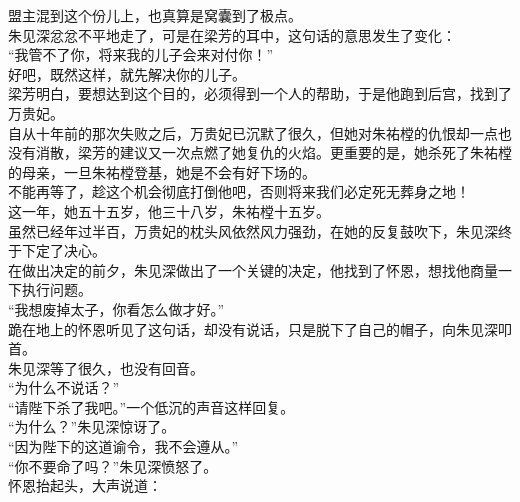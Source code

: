 \begin{multicols}{\theparacolNo}
盟主混到这个份儿上，也真算是窝囊到了极点。\\

朱见深忿忿不平地走了，可是在梁芳的耳中，这句话的意思发生了变化：\\

“我管不了你，将来我的儿子会来对付你！”\\

好吧，既然这样，就先解决你的儿子。\\

梁芳明白，要想达到这个目的，必须得到一个人的帮助，于是他跑到后宫，找到了万贵妃。\\

自从十年前的那次失败之后，万贵妃已沉默了很久，但她对朱祐樘的仇恨却一点也没有消散，梁芳的建议又一次点燃了她复仇的火焰。更重要的是，她杀死了朱祐樘的母亲，一旦朱祐樘登基，她是不会有好下场的。\\

不能再等了，趁这个机会彻底打倒他吧，否则将来我们必定死无葬身之地！\\

这一年，她五十五岁，他三十八岁，朱祐樘十五岁。\\

虽然已经年过半百，万贵妃的枕头风依然风力强劲，在她的反复鼓吹下，朱见深终于下定了决心。\\

在做出决定的前夕，朱见深做出了一个关键的决定，他找到了怀恩，想找他商量一下执行问题。\\

“我想废掉太子，你看怎么做才好。”\\

跪在地上的怀恩听见了这句话，却没有说话，只是脱下了自己的帽子，向朱见深叩首。\\

朱见深等了很久，也没有回音。\\

“为什么不说话？”\\

“请陛下杀了我吧。”一个低沉的声音这样回复。\\

“为什么？”朱见深惊讶了。\\

“因为陛下的这道谕令，我不会遵从。”\\

“你不要命了吗？”朱见深愤怒了。\\

怀恩抬起头，大声说道：\\


\end{multicols}
